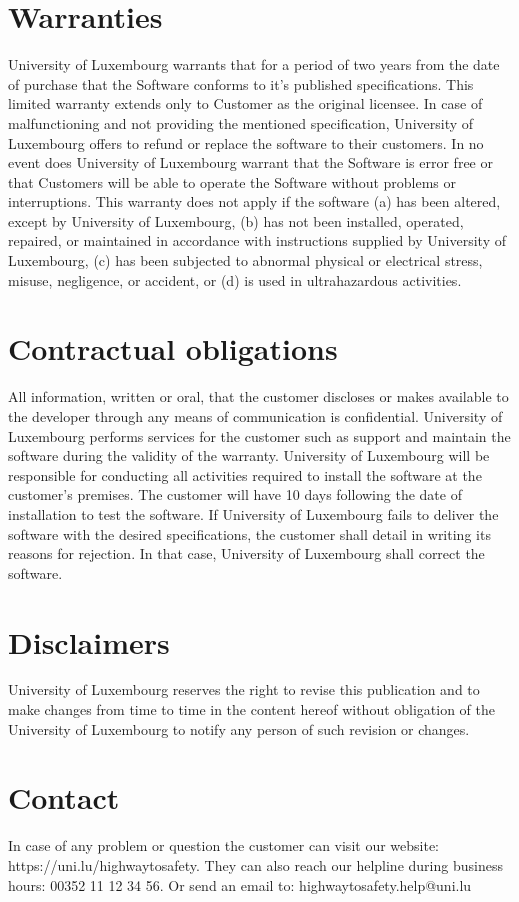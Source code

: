 \section{Warranties}
University of Luxembourg warrants that for a period of two years from the date
of purchase that the Software conforms to it's published specifications. This
limited warranty extends only to Customer as the original licensee. In case of
malfunctioning and not providing the mentioned specification, University of
Luxembourg offers to refund or replace the software to their customers. In no
event does University of Luxembourg warrant that the Software is error free or
that Customers will be able to operate the Software without problems or
interruptions. This warranty does not apply if the software (a) has been
altered, except by University of Luxembourg, (b) has not been installed,
operated, repaired, or maintained in accordance with instructions supplied by
University of Luxembourg, (c) has been subjected to abnormal physical or
electrical stress, misuse, negligence, or accident, or (d) is used in
ultrahazardous activities.

\section{Contractual obligations}
All information, written or oral, that the customer discloses or makes available
to the developer through any means of communication is confidential.
University of Luxembourg performs services for the customer such as support and
maintain the software during the validity of the warranty.
University of Luxembourg will be responsible for conducting all activities
required to install the software at the customer's premises.
The customer will have 10 days following the date of installation to test the
software.
If University of Luxembourg fails to deliver the software with the desired
specifications, the customer shall detail in writing its reasons for rejection.
In that case, University of Luxembourg shall correct the software.

\section{Disclaimers}
University of Luxembourg reserves the right to revise this publication and to
make changes from time to time in the content hereof without obligation of the
University of Luxembourg to notify any person of such revision or changes.

\section{Contact}
In case of any problem or question the customer can visit our website:
https://uni.lu/highwaytosafety.                                                 
They can also reach our helpline during business hours: 00352 11 12 34 56.      
Or send an email to: highwaytosafety.help@uni.lu